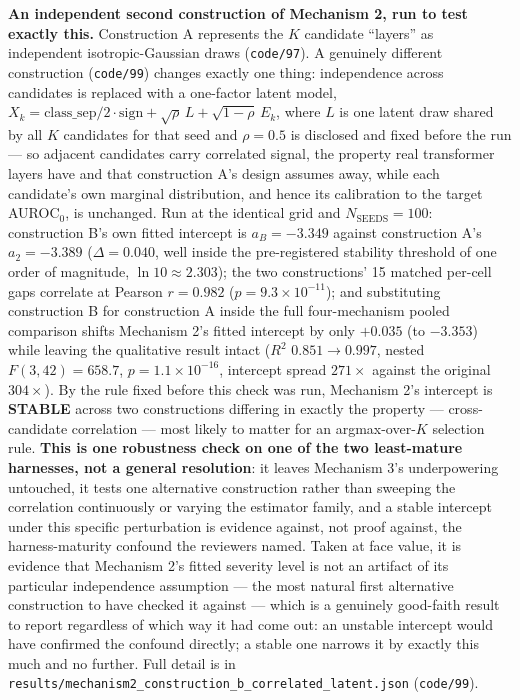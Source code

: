 \documentclass[10pt]{article} %
\begin{document}
\textbf{An independent second construction of Mechanism 2, run to test
exactly this.} Construction A represents the $K$ candidate ``layers'' as
independent isotropic-Gaussian draws (\texttt{code/97}). A genuinely
different construction (\texttt{code/99}) changes exactly one thing:
independence across candidates is replaced with a one-factor latent model,
$X_k=\text{class\_sep}/2\cdot\text{sign}+\sqrt{\rho}\,L+\sqrt{1-\rho}\,E_k$,
where $L$ is one latent draw shared by all $K$ candidates for that seed and
$\rho=0.5$ is disclosed and fixed before the run --- so adjacent candidates
carry correlated signal, the property real transformer layers have and that
construction A's design assumes away, while each candidate's own marginal
distribution, and hence its calibration to the target AUROC$_0$, is
unchanged. Run at the identical grid and $N_{\text{SEEDS}}=100$: construction
B's own fitted intercept is $a_B=-3.349$ against construction A's
$a_2=-3.389$ ($\Delta=0.040$, well inside the pre-registered stability
threshold of one order of magnitude, $\ln10\approx2.303$); the two
constructions' 15 matched per-cell gaps correlate at Pearson $r=0.982$
($p=9.3\times10^{-11}$); and substituting construction B for construction A
inside the full four-mechanism pooled comparison shifts Mechanism 2's fitted
intercept by only $+0.035$ (to $-3.353$) while leaving the qualitative result
intact ($R^2$ $0.851\to0.997$, nested $F(3,42)=658.7$, $p=1.1\times10^{-16}$,
intercept spread $271\times$ against the original $304\times$). By the rule
fixed before this check was run, Mechanism 2's intercept is \textbf{STABLE}
across two constructions differing in exactly the property --- cross-
candidate correlation --- most likely to matter for an argmax-over-$K$
selection rule. \textbf{This is one robustness check on one of the two
least-mature harnesses, not a general resolution}: it leaves Mechanism 3's
underpowering untouched, it tests one alternative construction rather than
sweeping the correlation continuously or varying the estimator family, and a
stable intercept under this specific perturbation is evidence against, not
proof against, the harness-maturity confound the reviewers named. Taken at
face value, it is evidence that Mechanism 2's fitted severity level is not an
artifact of its particular independence assumption --- the most natural
first alternative construction to have checked it against --- which is a
genuinely good-faith result to report regardless of which way it had come
out: an unstable intercept would have confirmed the confound directly; a
stable one narrows it by exactly this much and no further. Full detail is in
\texttt{results/mechanism2\_construction\_b\_correlated\_latent.json}
(\texttt{code/99}).
\end{document}
